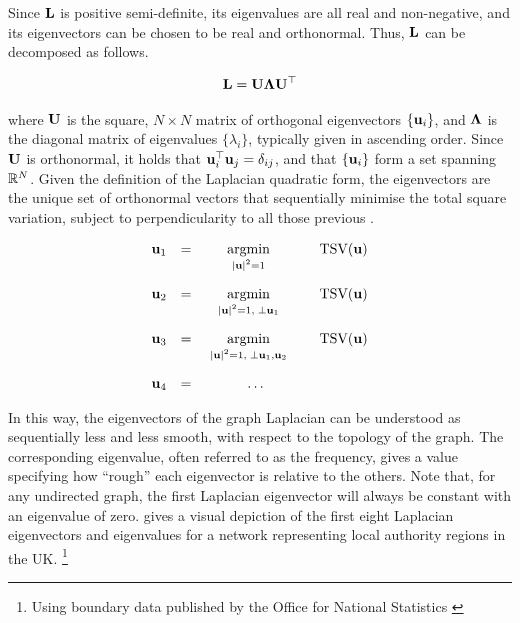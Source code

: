 Since $\mathbf{L}$ is positive semi-definite, its eigenvalues are all real and non-negative, and its eigenvectors can be chosen to be real and orthonormal. Thus, $\mathbf{L}$ can be decomposed as follows. 

\begin{equation}
    \mathbf{L} = \mathbf{U} \mathbf{\Lambda} \mathbf{U}^\top
\end{equation}

where $\mathbf{U}$ is the square, $N \times N$ matrix of orthogonal eigenvectors $\{\mathbf{u}_i\}$, and $\mathbf{\Lambda}$ is the diagonal matrix of eigenvalues $\{\lambda_i\}$, typically given in ascending order. Since $\mathbf{U}$ is orthonormal, it holds that $\mathbf{u}_i^\top \mathbf{u}_j = \delta_{ij}$, and that $\{\mathbf{u}_i\}$ form a set spanning $\mathbb{R}^N$. Given the definition of the Laplacian quadratic form, the eigenvectors are the unique set of orthonormal vectors that sequentially minimise the total square variation, subject to perpendicularity to all those previous \citep{Spielman2019}. 


$$
\begin{matrix}
    \uu_1 & = & \underset{\raisebox{-0.1cm} { $ \scriptstyle |\uu|^2 = 1$ }}{\text{argmin}} \quad & \text{TSV}(\uu) \\[0.7cm]
    \uu_2 & = & \underset{\raisebox{-0.1cm} { $ \scriptstyle |\uu|^2 = 1, \; \perp \uu_1$ }}{\text{argmin}} \quad & \text{TSV}(\uu) \\[0.7cm]
    \uu_3 & = & \underset{\raisebox{-0.1cm} { $ \scriptstyle |\uu|^2 = 1, \;\perp \uu_1, \uu_2$ }}{\text{argmin}} \quad & \text{TSV}(\uu) \\[0.7cm]
    \uu_4 & = & \ldots
\end{matrix}
$$

\newpage

In this way, the eigenvectors of the graph Laplacian can be understood as sequentially less and less smooth, with respect to the topology of the graph. The corresponding eigenvalue, often referred to as the frequency, gives a value specifying how ``rough'' each eigenvector is relative to the others. Note that, for any undirected graph, the first Laplacian eigenvector will always be constant with an eigenvalue of zero.  gives a visual depiction of the first eight Laplacian eigenvectors and eigenvalues for a network representing local authority regions in the UK. \footnote{Using boundary data published by the Office for National Statistics \citep{ONS2019}}  

